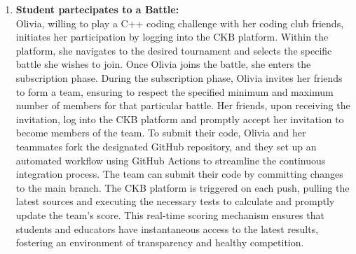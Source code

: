 \begin{enumerate}

    \item \textbf{Student partecipates to a Battle:} \\
    Olivia, willing to play a C++ coding challenge with her coding club friends, initiates her participation by logging into the CKB platform. Within the platform, she navigates to the desired tournament and selects the specific battle she wishes to join. Once Olivia joins the battle, she enters the subscription phase.
During the subscription phase, Olivia invites her friends to form a team, ensuring to respect the specified minimum and maximum number of members for that particular battle. Her friends, upon receiving the invitation, log into the CKB platform and promptly accept her invitation to become members of the team.
To submit their code, Olivia and her teammates fork the designated GitHub repository, and they set up an automated workflow using GitHub Actions to streamline the continuous integration process. The team can submit their code by committing changes to the main branch.
The CKB platform is triggered on each push, pulling the latest sources and executing the necessary tests to calculate and promptly update the team's score. This real-time scoring mechanism ensures that students and educators have instantaneous access to the latest results, fostering an environment of transparency and healthy competition.

    

\end{enumerate}
